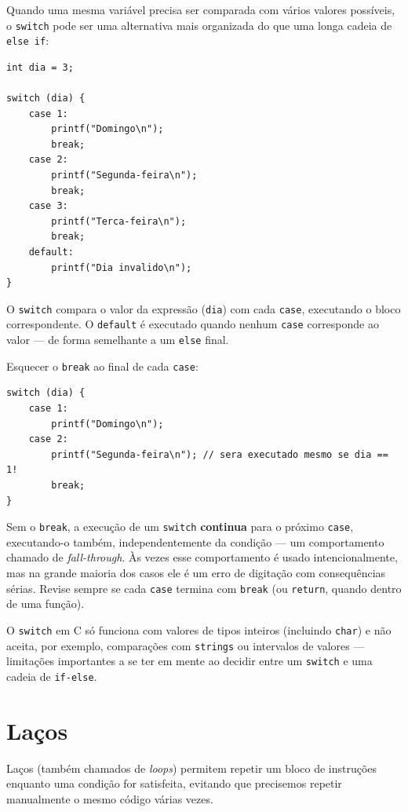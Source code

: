 Quando uma mesma variável precisa ser comparada com vários valores possíveis, o \texttt{switch} pode ser uma alternativa mais organizada do que uma longa cadeia de \texttt{else if}:

\begin{lstlisting}
int dia = 3;

switch (dia) {
    case 1:
        printf("Domingo\n");
        break;
    case 2:
        printf("Segunda-feira\n");
        break;
    case 3:
        printf("Terca-feira\n");
        break;
    default:
        printf("Dia invalido\n");
}
\end{lstlisting}

O \texttt{switch} compara o valor da expressão (\texttt{dia}) com cada \texttt{case}, executando o bloco correspondente. O \texttt{default} é executado quando nenhum \texttt{case} corresponde ao valor — de forma semelhante a um \texttt{else} final.

\begin{errocomum}
Esquecer o \texttt{break} ao final de cada \texttt{case}:
\begin{lstlisting}
switch (dia) {
    case 1:
        printf("Domingo\n");
    case 2:
        printf("Segunda-feira\n"); // sera executado mesmo se dia == 1!
        break;
}
\end{lstlisting}
Sem o \texttt{break}, a execução de um \texttt{switch} \textbf{continua} para o próximo \texttt{case}, executando-o também, independentemente da condição — um comportamento chamado de \textit{fall-through}. Às vezes esse comportamento é usado intencionalmente, mas na grande maioria dos casos ele é um erro de digitação com consequências sérias. Revise sempre se cada \texttt{case} termina com \texttt{break} (ou \texttt{return}, quando dentro de uma função).
\end{errocomum}

O \texttt{switch} em C só funciona com valores de tipos inteiros (incluindo \texttt{char}) e não aceita, por exemplo, comparações com \texttt{strings} ou intervalos de valores — limitações importantes a se ter em mente ao decidir entre um \texttt{switch} e uma cadeia de \texttt{if-else}.

\section{Laços}

Laços (também chamados de \textit{loops}) permitem repetir um bloco de instruções enquanto uma condição for satisfeita, evitando que precisemos repetir manualmente o mesmo código várias vezes.

